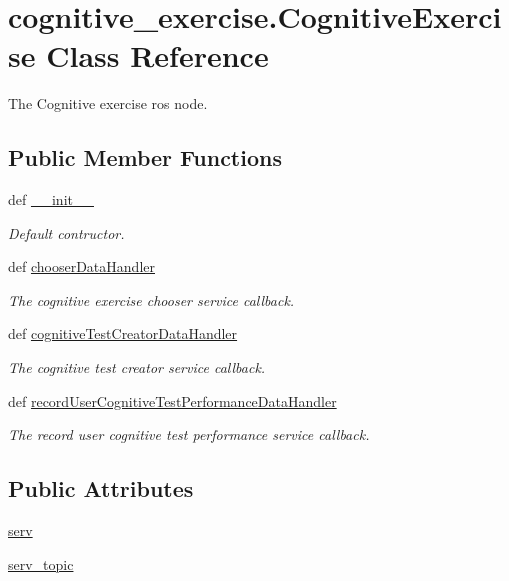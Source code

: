 \hypertarget{classcognitive__exercise_1_1CognitiveExercise}{\section{cognitive\-\_\-exercise.\-Cognitive\-Exercise Class Reference}
\label{classcognitive__exercise_1_1CognitiveExercise}
}


The Cognitive exercise ros node.  


\subsection*{Public Member Functions}
\begin{DoxyCompactItemize}
\item 
def \hyperlink{classcognitive__exercise_1_1CognitiveExercise_a3fca5be17a6fd570bd6eaf0f4685a9f3}{\-\_\-\-\_\-init\-\_\-\-\_\-}
\begin{DoxyCompactList}\small\item\em Default contructor. \end{DoxyCompactList}\item 
def \hyperlink{classcognitive__exercise_1_1CognitiveExercise_a9dd876bf454c882ff033d599de997e61}{chooser\-Data\-Handler}
\begin{DoxyCompactList}\small\item\em The cognitive exercise chooser service callback. \end{DoxyCompactList}\item 
def \hyperlink{classcognitive__exercise_1_1CognitiveExercise_ae1ad82c51b716e39d703ea97573248c3}{cognitive\-Test\-Creator\-Data\-Handler}
\begin{DoxyCompactList}\small\item\em The cognitive test creator service callback. \end{DoxyCompactList}\item 
def \hyperlink{classcognitive__exercise_1_1CognitiveExercise_a0a98592e9555de734115f584fac38928}{record\-User\-Cognitive\-Test\-Performance\-Data\-Handler}
\begin{DoxyCompactList}\small\item\em The record user cognitive test performance service callback. \end{DoxyCompactList}\end{DoxyCompactItemize}
\subsection*{Public Attributes}
\begin{DoxyCompactItemize}
\item 
\hyperlink{classcognitive__exercise_1_1CognitiveExercise_a31a4e22c02bc1d7bda11b5e1fda5d065}{serv}
\item 
\hyperlink{classcognitive__exercise_1_1CognitiveExercise_a01c12d3ff9258c812e34f89a516699ed}{serv\-\_\-topic}
\end{DoxyCompactItemize}


